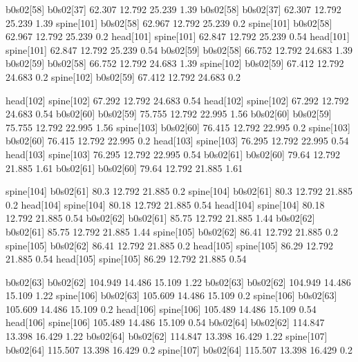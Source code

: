 b0s02[58]    b0s02[37]    62.307    12.792    25.239    1.39
b0s02[58]    b0s02[37]    62.307    12.792    25.239    1.39
spine[101]    b0s02[58]    62.967    12.792    25.239    0.2
spine[101]    b0s02[58]    62.967    12.792    25.239    0.2
head[101]    spine[101]    62.847    12.792    25.239    0.54
head[101]    spine[101]    62.847    12.792    25.239    0.54
b0s02[59]    b0s02[58]    66.752    12.792    24.683    1.39
b0s02[59]    b0s02[58]    66.752    12.792    24.683    1.39
spine[102]    b0s02[59]    67.412    12.792    24.683    0.2
spine[102]    b0s02[59]    67.412    12.792    24.683    0.2


head[102]    spine[102]    67.292    12.792    24.683    0.54
head[102]    spine[102]    67.292    12.792    24.683    0.54
b0s02[60]    b0s02[59]    75.755    12.792    22.995    1.56
b0s02[60]    b0s02[59]    75.755    12.792    22.995    1.56
spine[103]    b0s02[60]    76.415    12.792    22.995    0.2
spine[103]    b0s02[60]    76.415    12.792    22.995    0.2
head[103]    spine[103]    76.295    12.792    22.995    0.54
head[103]    spine[103]    76.295    12.792    22.995    0.54
b0s02[61]    b0s02[60]    79.64    12.792    21.885    1.61
b0s02[61]    b0s02[60]    79.64    12.792    21.885    1.61


spine[104]    b0s02[61]    80.3    12.792    21.885    0.2
spine[104]    b0s02[61]    80.3    12.792    21.885    0.2
head[104]    spine[104]    80.18    12.792    21.885    0.54
head[104]    spine[104]    80.18    12.792    21.885    0.54
b0s02[62]    b0s02[61]    85.75    12.792    21.885    1.44
b0s02[62]    b0s02[61]    85.75    12.792    21.885    1.44
spine[105]    b0s02[62]    86.41    12.792    21.885    0.2
spine[105]    b0s02[62]    86.41    12.792    21.885    0.2
head[105]    spine[105]    86.29    12.792    21.885    0.54
head[105]    spine[105]    86.29    12.792    21.885    0.54


b0s02[63]    b0s02[62]    104.949    14.486    15.109    1.22
b0s02[63]    b0s02[62]    104.949    14.486    15.109    1.22
spine[106]    b0s02[63]    105.609    14.486    15.109    0.2
spine[106]    b0s02[63]    105.609    14.486    15.109    0.2
head[106]    spine[106]    105.489    14.486    15.109    0.54
head[106]    spine[106]    105.489    14.486    15.109    0.54
b0s02[64]    b0s02[62]    114.847    13.398    16.429    1.22
b0s02[64]    b0s02[62]    114.847    13.398    16.429    1.22
spine[107]    b0s02[64]    115.507    13.398    16.429    0.2
spine[107]    b0s02[64]    115.507    13.398    16.429    0.2


